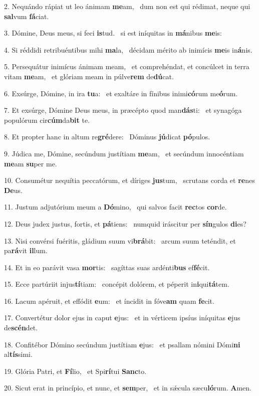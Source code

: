 2. Nequándo rápiat ut leo ánimam \textbf{me}am, \ast\  dum non est qui rédimat, neque qui \textbf{sal}vum \textbf{fá}ciat.\

3. Dómine, Deus meus, si feci \textbf{is}tud. \ast\  si est iníquitas in \textbf{má}nibus \textbf{me}is:\

4. Si réddidi retribuéntibus mihi \textbf{ma}la, \ast\  décidam mérito ab inimícis \textbf{me}is in\textbf{á}nis.\

5. Persequátur inimícus ánimam meam, \dag\  et comprehéndat, et concúlcet in terra vitam \textbf{me}am, \ast\  et glóriam meam in púlve\textbf{rem} de\textbf{dú}cat.\

6. Exsúrge, Dómine, in ira \textbf{tu}a: \ast\  et exaltáre in fínibus inimi\textbf{có}rum me\textbf{ó}rum.\

7. Et exsúrge, Dómine Deus meus, in præcépto quod man\textbf{dás}ti: \ast\  et synagóga populórum cir\textbf{cúm}da\textbf{bit} te.\

8. Et propter hanc in altum re\textbf{gré}dere: \ast\  Dóminus \textbf{jú}dicat \textbf{pó}pulos.\

9. Júdica me, Dómine, secúndum justítiam \textbf{me}am, \ast\  et secúndum innocéntiam \textbf{me}am \textbf{su}per me.\

10. Consumétur nequítia peccatórum, et díriges \textbf{jus}tum, \ast\  scrutans corda et \textbf{re}nes \textbf{De}us.\

11. Justum adjutórium meum a \textbf{Dó}mino, \ast\  qui salvos facit \textbf{rec}tos \textbf{cor}de.\

12. Deus judex justus, fortis, et \textbf{pá}tiens: \ast\  numquid iráscitur per \textbf{sín}gulos \textbf{di}es?\

13. Nisi convérsi fuéritis, gládium suum vi\textbf{brá}bit: \ast\  arcum suum teténdit, et pa\textbf{rá}vit \textbf{il}lum.\

14. Et in eo parávit vasa \textbf{mor}tis: \ast\  sagíttas suas ardénti\textbf{bus} ef\textbf{fé}cit.\

15. Ecce partúriit injus\textbf{tí}tiam: \ast\  concépit dolórem, et péperit in\textbf{i}qui\textbf{tá}tem.\

16. Lacum apéruit, et effódit \textbf{e}um: \ast\  et íncidit in fóve\textbf{am} quam \textbf{fe}cit.\

17. Convertétur dolor ejus in caput \textbf{e}jus: \ast\  et in vérticem ipsíus iníquitas \textbf{e}jus de\textbf{scén}det.\

18. Confitébor Dómino secúndum justítiam \textbf{e}jus: \ast\  et psallam nómini Dómi\textbf{ni} al\textbf{tís}simi.\

19. Glória Patri, et \textbf{Fí}lio, \ast\  et Spi\textbf{rí}tui \textbf{Sanc}to.\

20. Sicut erat in princípio, et nunc, et \textbf{sem}per, \ast\  et in sǽcula sæcu\textbf{ló}rum. \textbf{A}men.\

